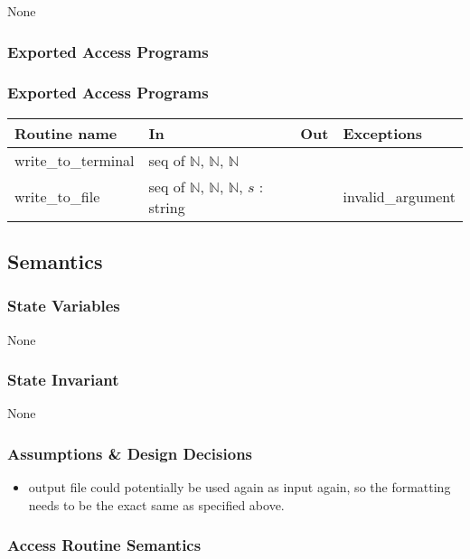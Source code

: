 \documentclass[12pt]{article}
\begin{document}
None

\subsubsection* {Exported Access Programs}

\subsubsection* {Exported Access Programs}

\begin{tabular}{| l | l | l | l |}
\hline
\textbf{Routine name} & \textbf{In} & \textbf{Out} & \textbf{Exceptions}\\
\hline
write\_to\_terminal & seq of $\mathbb{N}$, $\mathbb{N}$, $\mathbb{N}$  & & \\
\hline
write\_to\_file & seq of $\mathbb{N}$, $\mathbb{N}$, $\mathbb{N}$, $s$ : string & & invalid\_argument \\
\hline
\end{tabular}


\subsection* {Semantics}

\subsubsection* {State Variables}
None

\subsubsection* {State Invariant}
None

\subsubsection* {Assumptions \& Design Decisions}

\begin{itemize}
\item output file could potentially be used again as input again, so the formatting needs to be the exact same as specified above.
\end{itemize}



\subsubsection* {Access Routine Semantics}
\end{document}
